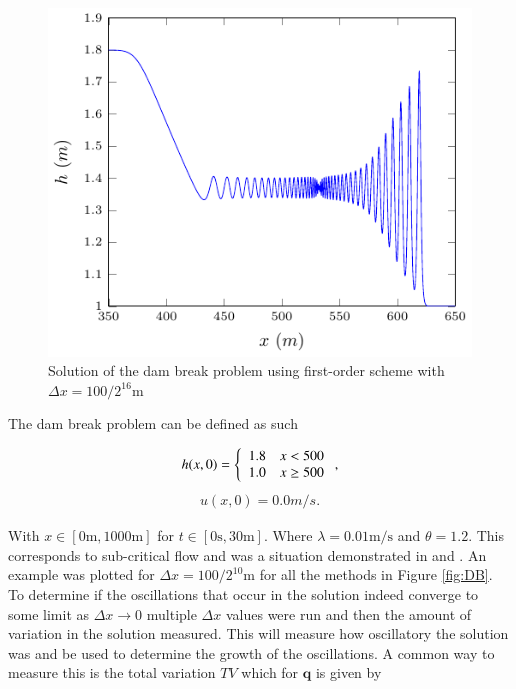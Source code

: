 \documentclass[SingleSpace,12pt]{Serre_ASCE}
\begin{document}
\begin{figure}[htb]
\centering
\includegraphics[width=15.0cm]{./results/dambreak/ex/o1-figure1.pdf}
\caption{Solution of the dam break problem using first-order scheme with $\Delta x = 100 /2^{16} \text{m}$ }
\label{fig:DB1o1}
\end{figure}
The dam break problem can be defined as such
\begin{linenomath*}
\begin{gather}
h(x,0) = \left\lbrace \begin{array}{c c}
1.8 & x < 500\\
1.0 & x \ge 500\\
\end{array} \right. ,
\end{gather}
\begin{gather}
u(x,0) = 0.0m/s.
\end{gather}
\end{linenomath*}
With $x \in \left[0\text{m},1000\text{m}\right]$ for $t \in \left[0\text{s},30\text{m}\right]$. Where $\lambda = 0.01 \text{m/s}$ and $\theta = 1.2$. This corresponds to sub-critical flow and was a situation demonstrated in  and . An example was plotted for $\Delta x = 100 /2^{10}\text{m}$ for all the methods in Figure \ref{fig:DB}. To determine if the oscillations that occur in the solution indeed converge to some limit as $\Delta x \rightarrow 0$ multiple $\Delta x$ values were run and then the amount of variation in the solution measured. This will measure how oscillatory the solution was and be used to determine the growth of the oscillations. A common way to measure this is the total variation $TV$ \cite{LeVeque-2002} which for $\boldsymbol{q}$ is given by
\end{document}

